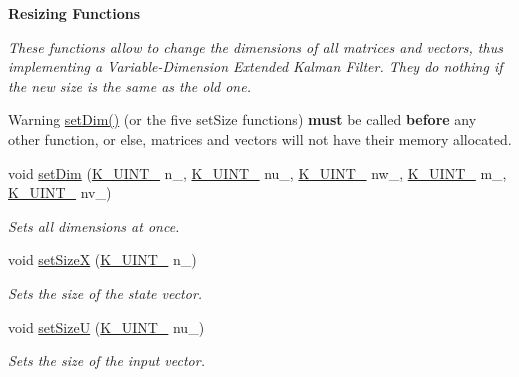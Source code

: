 \begin{Indent}\textbf{ Resizing Functions}\par
{\em These functions allow to change the dimensions of all matrices and vectors, thus implementing a Variable-\/\+Dimension Extended Kalman Filter. They do nothing if the new size is the same as the old one. \begin{DoxyWarning}{Warning}
{\ttfamily \mbox{\hyperlink{classKalman_1_1EKFilter_a0c311fd7fc6d57c206029ea0e902cf2e}{set\+Dim()}}} (or the five {\ttfamily set\+Size} functions) {\bfseries must} be called {\bfseries before} any other function, or else, matrices and vectors will not have their memory allocated. 
\end{DoxyWarning}
}\begin{DoxyCompactItemize}
\item 
void \mbox{\hyperlink{classKalman_1_1EKFilter_a0c311fd7fc6d57c206029ea0e902cf2e}{set\+Dim}} (\mbox{\hyperlink{namespaceKalman_a628a50cae10f6e2035393d4f96c698bd}{K\+\_\+\+U\+I\+N\+T\+\_}} n\+\_\+, \mbox{\hyperlink{namespaceKalman_a628a50cae10f6e2035393d4f96c698bd}{K\+\_\+\+U\+I\+N\+T\+\_}} nu\+\_\+, \mbox{\hyperlink{namespaceKalman_a628a50cae10f6e2035393d4f96c698bd}{K\+\_\+\+U\+I\+N\+T\+\_}} nw\+\_\+, \mbox{\hyperlink{namespaceKalman_a628a50cae10f6e2035393d4f96c698bd}{K\+\_\+\+U\+I\+N\+T\+\_}} m\+\_\+, \mbox{\hyperlink{namespaceKalman_a628a50cae10f6e2035393d4f96c698bd}{K\+\_\+\+U\+I\+N\+T\+\_}} nv\+\_\+)
\begin{DoxyCompactList}\small\item\em Sets all dimensions at once. \end{DoxyCompactList}\item 
void \mbox{\hyperlink{classKalman_1_1EKFilter_a9c56983458ab0d3dca1a855baee71280}{set\+SizeX}} (\mbox{\hyperlink{namespaceKalman_a628a50cae10f6e2035393d4f96c698bd}{K\+\_\+\+U\+I\+N\+T\+\_}} n\+\_\+)
\begin{DoxyCompactList}\small\item\em Sets the size of the state vector. \end{DoxyCompactList}\item 
\mbox{\label{classKalman_1_1EKFilter_a012ca0bbb28a1a4ea93a8ff0f5f07f20}} 
void \mbox{\hyperlink{classKalman_1_1EKFilter_a012ca0bbb28a1a4ea93a8ff0f5f07f20}{set\+SizeU}} (\mbox{\hyperlink{namespaceKalman_a628a50cae10f6e2035393d4f96c698bd}{K\+\_\+\+U\+I\+N\+T\+\_}} nu\+\_\+)
\begin{DoxyCompactList}\small\item\em Sets the size of the input vector. \end{DoxyCompactList}\item 

\end{DoxyCompactItemize}
\end{Indent}
